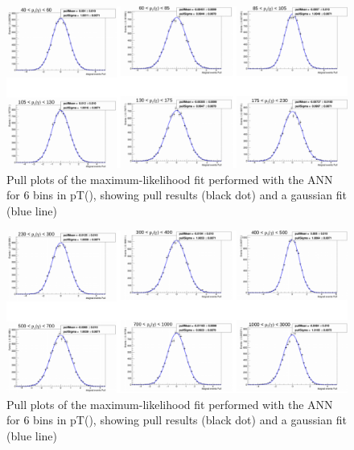 \documentclass[11pt,a4paper]{report}
\theoremstyle{break}
\begin{document}
\begin{appendix}
\begin{figure}[h!]
\centering
    \includegraphics[width=1\textwidth]{pull_pad1}
    \caption{Pull plots of the maximum-likelihood fit performed with the ANN for 6 bins in pT(\textgamma), showing pull
    results (black dot) and a gaussian fit (blue line)}
    \label{pull_pad1}
\end{figure}
\begin{figure}[h!]
\centering
    \includegraphics[width=1\textwidth]{pull_pad2}
    \caption{Pull plots of the maximum-likelihood fit performed with the ANN for 6 bins in pT(\textgamma), showing pull
    results (black dot) and a gaussian fit (blue line)}
    \label{pull_pad1}
\end{figure}

\end{appendix}

\end{document}
